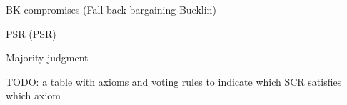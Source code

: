 \begin{genthm}{BK compromises (Fall-back bargaining-Bucklin)}
	
\end{genthm}

\begin{genthm}{\acl{PSR} (\acs{PSR})}
	
\end{genthm}

\begin{genthm}{Majority judgment}
	
\end{genthm}


TODO: a table with axioms and voting rules to indicate which SCR satisfies which axiom











